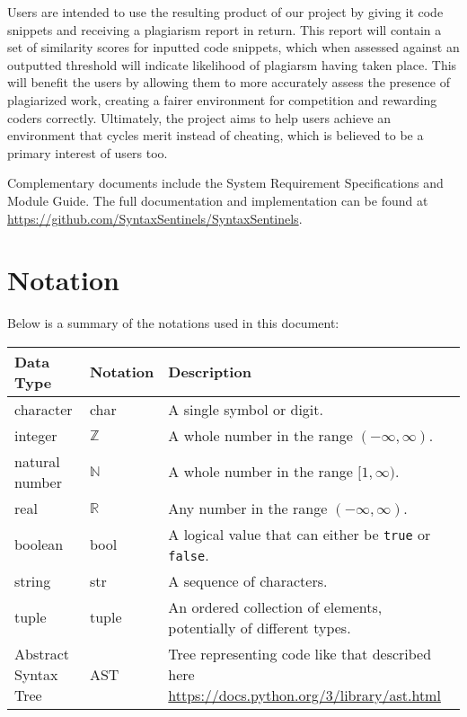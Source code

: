 \documentclass[12pt, titlepage]{article}
\begin{document}
Users are intended to use the resulting product of our project by giving
it code snippets and receiving a plagiarism report in return. This report
will contain a set of similarity scores for inputted code snippets, which when
assessed against an outputted threshold will indicate likelihood of plagiarsm
having taken place. This will benefit the users by allowing them to more accurately assess the presence of plagiarized work, 
creating a fairer environment for competition and rewarding coders correctly. 
Ultimately, the project aims to help users achieve an environment that cycles merit 
instead of cheating, which is believed to be a primary interest of users too.

Complementary documents include the System Requirement Specifications
and Module Guide.  The full documentation and implementation can be
found at \url{https://github.com/SyntaxSentinels/SyntaxSentinels}. 

\section{Notation}

Below is a summary of the notations used in this document:

\begin{center}
\renewcommand{\arraystretch}{1.2}
\noindent
\begin{tabular}{l l p{8cm}} 
\toprule 
\textbf{Data Type} & \textbf{Notation} & \textbf{Description} \\ 
\midrule
character & char & A single symbol or digit. \\ 
integer & $\mathbb{Z}$ & A whole number in the range $(-\infty, \infty)$. \\ 
natural number & $\mathbb{N}$ & A whole number in the range $[1, \infty)$. \\ 
real & $\mathbb{R}$ & Any number in the range $(-\infty, \infty)$. \\ 
boolean & bool & A logical value that can either be \texttt{true} or \texttt{false}. \\
string & str & A sequence of characters. \\ 
tuple & tuple & An ordered collection of elements, potentially of different types. \\
Abstract Syntax Tree & AST & Tree representing code like that described here \url{https://docs.python.org/3/library/ast.html}
\bottomrule 
\end{tabular} 
\end{center}
\end{document}
